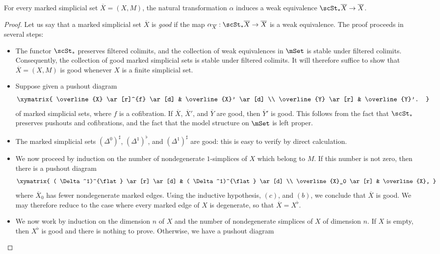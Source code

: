 \begin{proposition}\label{uil}
For every marked simplicial set $\overline{X} = (X,M)$, the natural transformation $\alpha$
induces a weak equivalence $\scSt_{\ast} \overline{X} \rightarrow \overline{X}$.
\end{proposition}

\begin{proof}
Let us say that a marked simplicial set $\overline{X}$ is {\em good} if the map
$\alpha_{ \overline{X}}: \scSt_{\ast} \overline{X} \rightarrow \overline{X}$ is a weak equivalence.
The proof proceeds in several steps:
\begin{itemize}
\item[$(a)$] The functor $\scSt_{\ast}$ preserves filtered colimits, and the collection of weak equivalences in $\mSet$ is stable under filtered colimits. Consequently, the collection of good
marked simplicial sets is stable under filtered colimits. It will therefore suffice to show that
$\overline{X}=(X,M)$ is good whenever $X$ is a finite simplicial set.
\item[$(b)$] Suppose given a pushout diagram
$$ \xymatrix{ \overline{X} \ar[r]^{f} \ar[d] & \overline{X}' \ar[d] \\
\overline{Y} \ar[r] & \overline{Y}'. }$$
of marked simplicial sets, where $f$ is a cofibration. If $\overline{X}$, $ \overline{X}'$, and
$\overline{Y}$ are good, then $\overline{Y}'$ is good. This follows from the 
fact that $\scSt_{\ast}$ preserves pushouts and cofibrations, and the fact that the model 
structure on $\mSet$ is left proper.
\item[$(c)$] The marked simplicial sets $( \Delta^0)^{\sharp}$, $(\Delta^1)^{\flat}$, and
$(\Delta^1)^{\sharp}$ are good: this is easy to verify by direct calculation.
\item[$(d)$] We now proceed by induction on the number of nondegenerate $1$-simplices of $X$ which belong to $M$. If this number is not zero, then there is a pushout diagram
$$ \xymatrix{ ( \Delta^1)^{\flat} \ar[r] \ar[d] & ( \Delta^1)^{\flat} \ar[d] \\
\overline{X}_0 \ar[r] & \overline{X}, }$$
where $\overline{X}_0$ has fewer nondegenerate marked edges. Using the inductive hypothesis,
$(c)$, and $(b)$, we conclude that $\overline{X}$ is good. We may therefore reduce to the case
where every marked edge of $X$ is degenerate, so that $\overline{X} = X^{\flat}$.
\item[$(e)$] We now work by induction on the dimension $n$ of $X$ and the number of 
nondegenerate simplices of $X$ of dimension $n$. If $X$ is empty, then $X^{\flat}$ is good and there is nothing to prove. Otherwise, we have a pushout diagram

\end{itemize}
\end{proof}
